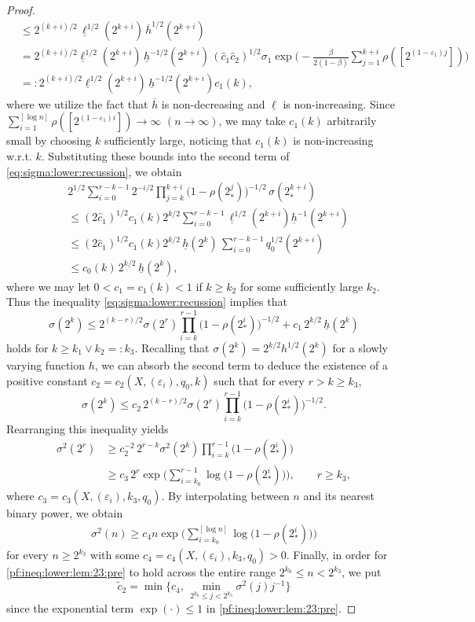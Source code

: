 \documentclass[11pt,a4,leqno]{amsart}
\newcommand{\ov}{\overline}
\newcommand{\ud}{\underline}
\newcommand{\wt}{\widetilde}
\newcommand{\wh}{\widehat}
\newcommand{\vep}{\varepsilon}
\newcommand{\1}{{\mathbf 1}}
\begin{document}
\begin{proof}
\begin{align*}
& \le 2^{(k+i)/2}\, \ud \ell^{1/2}(2^{k+i})\,\ov h^{1/2}(2^{k+i}) \\
& =2^{(k+i)/2} \ud \ell^{1/2}(2^{k+i})\, \ud h^{-1/2}(2^{k+i})\,(\wh c_1 \wh c_2)^{1/2} \sigma_1 \exp\bigg(
-\frac{\beta}{2(1-\beta)} \sum_{j=1}^{k+i}{\rho([2^{(1-\vep_1)j}])}
\bigg) \\
& =:2^{(k+i)/2} \ud \ell^{1/2}(2^{k+i}) \,\ud h^{-1/2}(2^{k+i}) c_1(k),
\end{align*}
where we utilize the fact that $\ov h$ is non-decreasing and $\ud \ell$ is non-increasing.  
Since $\sum_{i=1}^{[\log n]} \rho([2^{(1-\vep_1)i}])\to \infty$ $(n\to\infty)$, we may take $c_1(k)$ arbitrarily small 
by choosing $k$ sufficiently large, noticing that $c_1(k)$ is non-increasing w.r.t. $k$. 
Substituting these bounds into the second term of \eqref{eq:sigma:lower:recussion}, we obtain  
\begin{align*}
& 2^{1/2} \sum_{i=0}^{r-k-1} 2^{-i/2} \prod_{j=k}^{k+i} \big(1-\rho (2^{j}_\ast) \big)^{-1/2}\, \sigma(2^{k+i}_\ast) \\
&\le (2\wh c_1)^{1/2} c_1(k) 2^{k/2} \sum_{i=0}^{r-k-1} \ud\ell^{1/2}(2^{k+i}) \ud h^{-1}(2^{k+i}) \\
&\le (2 \wh c_1)^{1/2} c_1(k) 2^{k/2}\, \ud h(2^k)\, \sum_{i=0}^{r-k-1} q_0^{1/2}(2^{k+i}) \\ 
&\le  c_0(k) \,2^{k/2 }\,\ud h(2^k),  
\end{align*}
where we may let $0<c_1=c_1(k) <1$ if $k\ge k_2$ for some sufficiently large $k_2$.
Thus the inequality \eqref{eq:sigma:lower:recussion} implies that 
\[
 \sigma(2^k) \le 2^{(k-r)/2} \sigma(2^r) \prod_{i=k}^{r-1}\big(
1-\rho(2^i_\ast)
\big)^{-1/2} + c_1\, 2^{k/2}\,\ud h(2^k)
\]
holds for $k\ge k_1 \vee k_2 =:k_3$. 
Recalling  
that $\sigma(2^k)=2^{k/2} h^{1/2}(2^k)$ for 
a slowly varying function $h$, 
we can absorb the second term to deduce the existence of a positive constant 
$ c_2 = c_2 (X,(\vep_i),q_0,k)$ such that for every $r>k \ge k_3$,
\[
 \sigma(2^k) \le c_2\, 2^{(k-r)/2} \sigma(2^r) \prod_{i=k}^{r-1} 
\big(1-\rho(2^i_\ast) \big)^{-1/2}. 
\]
Rearranging this inequality yields
\begin{align*}
 \sigma^2(2^r) &\ge  c_2^{-2} \,2^{r-k} \sigma^2(2^k) \prod_{i=k}^{r-1} \big(
1-\rho(2^i_\ast)\big) \\
& \ge  c_3\,2^r \exp\bigg(
\sum_{i=k_0}^{r-1} \log \big(
1-\rho(2^i_\ast )
\big)\bigg), \qquad r\ge k_3,
\end{align*}
where $ c_3 = c_3(X, (\vep_i),k_3,q_0)$. 
By interpolating between $n$ and its nearest binary power, we obtain
\begin{align}
\label{pf:ineq:lower:lem:23:pre}
 \sigma^2(n) \ge c_4 n \exp\bigg(
\sum_{i=k_0}^{[\log n]}
 \log \big(
1-\rho(2^i_\ast )
\big)
\bigg)
\end{align}
for every $n\ge 2^{k_3}$ with some $c_4=c_4(X, (\vep_i),k_3,q_0)>0$.   
Finally, in order for \eqref{pf:ineq:lower:lem:23:pre} to hold across the entire range $2^{k_0}\le n<2^{k_3}$, we put 
\[
 \wt c_2 = \min\Big\{
c_4,\,\min_{2^{k_0}\le j<2^{k_3}}\sigma^2(j)j^{-1}
\Big\}
\]
since the exponential term $\exp(\cdot)\le 1$ in \eqref{pf:ineq:lower:lem:23:pre}.
\end{proof}
\end{document}
